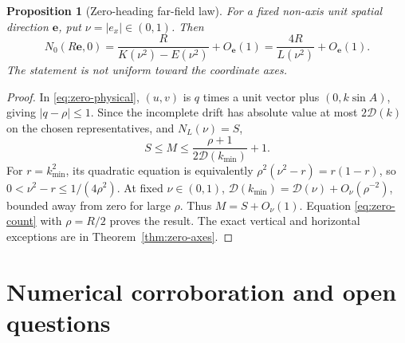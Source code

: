 \documentclass[11pt,a4paper]{article}
\newtheorem{proposition}[theorem]{Proposition}
\theoremstyle{remark}\newtheorem{remark}[theorem]{Remark}
\begin{document}
\begin{proposition}[Zero-heading far-field law]\label{prop:zero-farfield}
For a fixed non-axis unit spatial direction $\mathbf e$, put
$\nu=|e_x|\in(0,1)$. Then
\[
 N_0(R\mathbf e,0)
   =\frac{R}{K(\nu^2)-E(\nu^2)}+O_{\mathbf e}(1)
   =\frac{4R}{L(\nu^2)}+O_{\mathbf e}(1).
\]
The statement is not uniform toward the coordinate axes.
\end{proposition}
\begin{proof}
In \eqref{eq:zero-physical}, $(u,v)$ is $q$ times a unit vector
plus $(0,k\sin A)$, giving $|q-\rho|\le1$. Since the incomplete
drift has absolute value at most $2\mathcal D(k)$ on the chosen
representatives, and $N_L(\nu)=S$,
\[
 S\le M\le\frac{\rho+1}{2\mathcal D(k_{\min})}+1.
\]
For $r=k_{\min}^2$, its quadratic equation is equivalently
$\rho^2(\nu^2-r)=r(1-r)$, so
$0<\nu^2-r\le1/(4\rho^2)$.
At fixed $\nu\in(0,1)$,
$\mathcal D(k_{\min})=\mathcal D(\nu)+O_\nu(\rho^{-2})$,
bounded away from zero for large $\rho$. Thus $M=S+O_\nu(1)$.
Equation \eqref{eq:zero-count} with $\rho=R/2$ proves the result.
The exact vertical and horizontal exceptions are in
Theorem~\ref{thm:zero-axes}.
\end{proof}

\section{Numerical corroboration and open questions}
\label{sec:corroboration}
\end{document}
